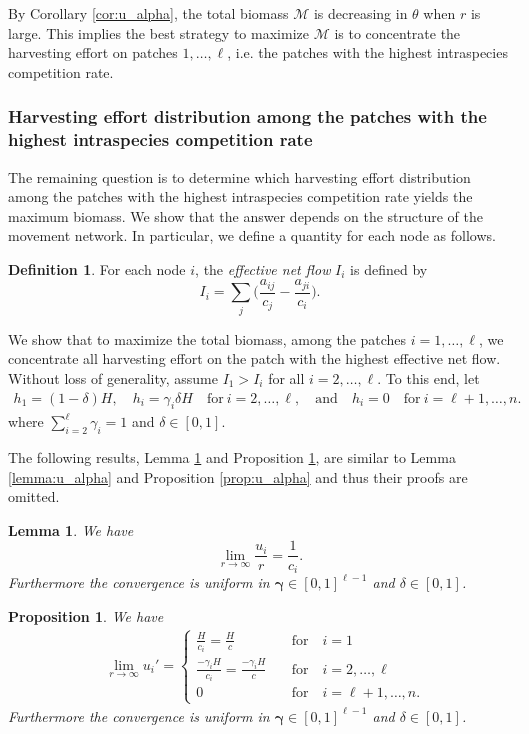 \documentclass[11pt]{article}
\newtheorem{lemma}[theorem]{Lemma}
\newtheorem{proposition}[theorem]{Proposition}
\def\MM{\mathcal{M}}
\theoremstyle{definition}
\newtheorem{definition}[theorem]{Definition}
\begin{document}
By Corollary \ref{cor:u_alpha}, the total biomass $\MM$ is decreasing in $\theta$ when $r$ is large. This implies the best strategy to maximize $\MM$ is to concentrate the harvesting effort on patches $1,\dots,\ell$, i.e. the patches with the highest intraspecies competition rate.



\subsubsection{Harvesting effort distribution among the patches with the highest intraspecies competition rate}


The remaining question is to determine which harvesting effort distribution among the patches with the highest intraspecies competition rate yields the maximum biomass. We show that the answer depends on the structure of the movement network. In particular, we define a quantity for each node as follows.
\begin{definition}\label{def:netflow}
    For each node $i$, the \textit{effective net flow} $I_i$ is defined by
    \[
    I_i= \sum_j\bigg(\frac{a_{ij}}{c_j}-\frac{a_{ji}}{c_i} \bigg).
    \]
\end{definition}
We show that to maximize the total biomass, among the patches $i=1,\dots,\ell$, we concentrate all harvesting effort on the patch with the highest effective net flow. Without loss of generality, assume $I_1>I_i$ for all $i=2,\dots,\ell$.  To this end, let
\begin{align}\label{hi_3third}
h_1=(1-\delta)H, \quad  h_i=\gamma_i\delta H \quad \text{for} \  i=2,\dots,\ell, \quad \text{and}\quad h_i=0 \quad \text{for}\ i=\ell+1, \dots, n. 
\end{align}
where $\sum_{i=2}^\ell \gamma_i=1$ and $\delta\in[0,1]$.

The following results, Lemma \ref{lemma:u_gamma} and Proposition \ref{prop:u_gamma}, are similar to Lemma \ref{lemma:u_alpha} and Proposition \ref{prop:u_alpha} and thus their proofs are omitted.

\begin{lemma}\label{lemma:u_gamma}
We have
    \[
    \lim_{r\to\infty} \frac{u_i}{r} = \frac{1}{c_i}.
    \]
    Furthermore the convergence is uniform in $\bm\gamma\in [0, 1]^{\ell-1}$ and $\delta\in [0, 1]$.
\end{lemma}
\begin{proposition}\label{prop:u_gamma}
We have
\begin{align*}
&\lim_{r\to\infty} u_i' = \begin{cases}
\frac{H}{c_i} =\frac{H}{c} \quad &\text{for}\quad  i=1\\
\frac{-\gamma_i H}{c_i}=\frac{-\gamma_i H}{c} \quad &\text{for}\quad  i=2,\dots,\ell\\
0 \quad &\text{for}\quad  i=\ell+1,\dots,n.
\end{cases}    
\end{align*}
 Furthermore the convergence is uniform in $\bm\gamma\in [0, 1]^{\ell-1}$ and $\delta\in [0, 1]$.
\end{proposition}
\end{document}
